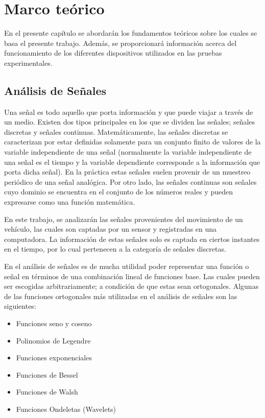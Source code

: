 \chapter{Marco teórico}


En el presente capítulo se abordarán los fundamentos teóricos sobre los cuales se basa el presente trabajo.
Además, se proporcionará información acerca del funcionamiento de los diferentes dispositivos utilizados en las pruebas experimentales.

\section{Análisis de Señales}

Una señal es todo aquello que porta información y que puede viajar a través de un medio. 
Existen dos tipos principales en los que se dividen las señales; señales discretas y señales continuas. 
Matemáticamente, las señales discretas se caracterizan por estar definidas solamente para un conjunto finito de valores de la variable independiente de una señal (normalmente la variable independiente de una señal es el tiempo y la variable dependiente corresponde a la información que porta dicha señal).
En la práctica estas señales suelen provenir de un muestreo periódico de una señal analógica.
Por otro lado, las señales continuas son señales cuyo dominio se encuentra en el conjunto de los números reales y pueden expresarse como una función matemática. 

En este trabajo, se analizarán las señales provenientes del movimiento de un vehículo, las cuales son captadas por un sensor y registradas en una computadora. 
La información de estas señales solo es captada en ciertos instantes en el tiempo, por lo cual pertenecen a la categoría de señales discretas.

En el análisis de señales es de mucha utilidad poder representar una función o señal en términos de una combinación lineal de funciones base. 
Las cuales pueden ser escogidas arbitrariamente; a condición de que estas sean ortogonales. 
Algunas de las funciones ortogonales más utilizadas en el análisis de señales son las siguientes:

\begin{itemize}
\item Funciones seno y coseno
\item Polinomios de Legendre
\item Funciones exponenciales
\item Funciones de Bessel
\item Funciones de Walsh
\item Funciones Ondeletas (Wavelets)
\end{itemize}

